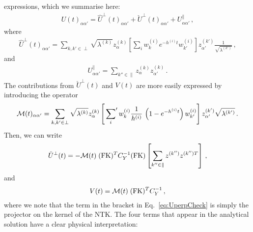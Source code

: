 expressions, which we summarise here: 
\begin{align}
    U(t)_{\alpha\alpha'} = \hat{U}^\perp(t)_{\alpha\alpha'}
        + \check{U}^\perp(t)_{\alpha\alpha'} + U^\parallel_{\alpha\alpha'}\, ,
\end{align}
where
\begin{align}
    \hat{U}^\perp(t)_{\alpha\alpha'}
        = \sum_{k,k'\in\perp} \sqrt{\lambda^{(k)}} z^{(k)}_\alpha 
            \left[\sum_i w^{(i)}_{k} e^{-h^{(i)}t} w^{(i)}_{k'}\right]
            z^{(k')}_{\alpha'} \frac{1}{\sqrt{\lambda^{(k')}}}\, ,
\end{align}
and
\begin{align}
    U^\parallel_{\alpha\alpha'}
        = \sum_{k''\in\parallel} z^{(k)}_\alpha z^{(k)}_{\alpha'} \, .
\end{align}
The contributions from $\check{U}^\perp(t)$ and $V(t)$ are more easily expressed
by introducing the operator
\begin{align}
    \label{eq:MOperatorDef}
    \mathcal{M}(t)_{\alpha\alpha'} 
        = \sum_{k,k'\in\perp} \sqrt{\lambda^{(k)}} z^{(k)}_\alpha 
            \left[\sideset{}{'}\sum_{i} w^{(i)}_{k} \frac{1}{h^{(i)}}\, 
            \left( 1- e^{-h^{(i)}t}\right) w^{(i)}_{k'}\right]
            z^{(k')}_{\alpha'} \sqrt{\lambda^{(k')}}\,. 
\end{align}
Then, we can write
\begin{align}
    \label{eq:UperpCheck}
    \check{U}^\perp(t)
        = - \mathcal{M}(t)\; (\mathrm{FK})^T C_Y^{-1} (\mathrm{FK}) 
            \left[\sum_{k''\in\parallel} z^{(k'')} z^{(k'') T}\right]\, ,
\end{align}
and
\begin{align}
    V(t) = \mathcal{M}(t)\; (\mathrm{FK})^T C_Y^{-1}\, ,
\end{align}
where we note that the term in the bracket in Eq.~\eqref{eq:UperpCheck} is
simply the projector on the kernel of the NTK. The four terms that appear in the
analytical solution have a clear physical interpretation:
